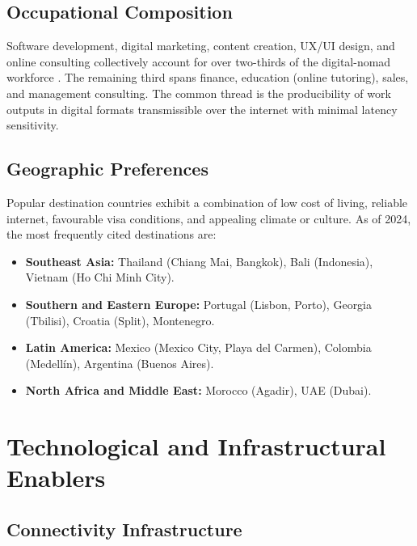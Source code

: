 \documentclass[12pt,a4paper]{article}
\begin{document}
\subsection{Occupational Composition}

Software development, digital marketing, content creation, UX/UI design, and
online consulting collectively account for over two-thirds of the digital-nomad
workforce \citep{NomadList2024}. The remaining third spans finance, education
(online tutoring), sales, and management consulting. The common thread is the
producibility of work outputs in digital formats transmissible over the
internet with minimal latency sensitivity.

\subsection{Geographic Preferences}

Popular destination countries exhibit a combination of low cost of living,
reliable internet, favourable visa conditions, and appealing climate or
culture. As of 2024, the most frequently cited destinations are:

\begin{itemize}
  \item \textbf{Southeast Asia:} Thailand (Chiang Mai, Bangkok), Bali
        (Indonesia), Vietnam (Ho Chi Minh City).
  \item \textbf{Southern and Eastern Europe:} Portugal (Lisbon, Porto), Georgia
        (Tbilisi), Croatia (Split), Montenegro.
  \item \textbf{Latin America:} Mexico (Mexico City, Playa del Carmen),
        Colombia (Medellín), Argentina (Buenos Aires).
  \item \textbf{North Africa and Middle East:} Morocco (Agadir), UAE (Dubai).
\end{itemize}

\section{Technological and Infrastructural Enablers}
\label{sec:enablers}

\subsection{Connectivity Infrastructure}
\end{document}
